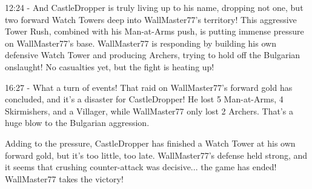 12:24 - And CastleDropper is truly living up to his name, dropping not one, but two forward Watch Towers deep into WallMaster77's territory! This aggressive Tower Rush, combined with his Man-at-Arms push, is putting immense pressure on WallMaster77's base. WallMaster77 is responding by building his own defensive Watch Tower and producing Archers, trying to hold off the Bulgarian onslaught! No casualties yet, but the fight is heating up! \par \vspace{1em}

16:27 - What a turn of events! That raid on WallMaster77's forward gold has concluded, and it's a disaster for CastleDropper! He lost 5 Man-at-Arms, 4 Skirmishers, and a Villager, while WallMaster77 only lost 2 Archers. That's a huge blow to the Bulgarian aggression. \par \vspace{1em}

Adding to the pressure, CastleDropper has finished a Watch Tower at his own forward gold, but it's too little, too late. WallMaster77's defense held strong, and it seems that crushing counter-attack was decisive... the game has ended! WallMaster77 takes the victory!
